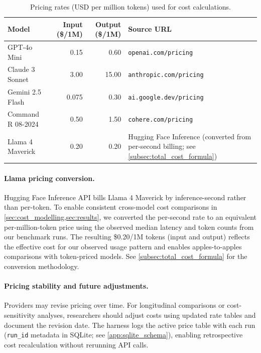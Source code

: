 \begin{table}[h!]
\centering
\caption{Pricing rates (USD per million tokens) used for cost calculations.\label{tab:pricing_metadata}}
\begin{tabularx}{\textwidth}{@{}l r r X@{}}
\toprule
\textbf{Model} & \textbf{Input (\$/1M)} & \textbf{Output (\$/1M)} & \textbf{Source URL} \\
\midrule
GPT-4o Mini & 0.15 & 0.60 & \texttt{openai.com/pricing} \\
Claude 3 Sonnet & 3.00 & 15.00 & \texttt{anthropic.com/pricing} \\
Gemini 2.5 Flash & 0.075 & 0.30 & \texttt{ai.google.dev/pricing} \\
Command R 08-2024 & 0.50 & 1.50 & \texttt{cohere.com/pricing} \\
Llama 4 Maverick & 0.20 & 0.20 & Hugging Face Inference (converted from per-second billing; see \cref{subsec:total_cost_formula}) \\
\bottomrule
\end{tabularx}
\end{table}

\paragraph{Llama pricing conversion.} Hugging Face Inference API bills Llama 4 Maverick by inference-second rather than per-token. To enable consistent cross-model cost comparisons in \cref{sec:cost_modelling,sec:results}, we converted the per-second rate to an equivalent per-million-token price using the observed median latency and token counts from our benchmark runs. The resulting \$0.20/1M tokens (input and output) reflects the effective cost for our observed usage pattern and enables apples-to-apples comparisons with token-priced models. See \cref{subsec:total_cost_formula} for the conversion methodology.

\paragraph{Pricing stability and future adjustments.} Providers may revise pricing over time. For longitudinal comparisons or cost-sensitivity analyses, researchers should adjust costs using updated rate tables and document the revision date. The harness logs the active price table with each run (\texttt{run\_id} metadata in SQLite; see \cref{app:sqlite_schema}), enabling retrospective cost recalculation without rerunning API calls.

